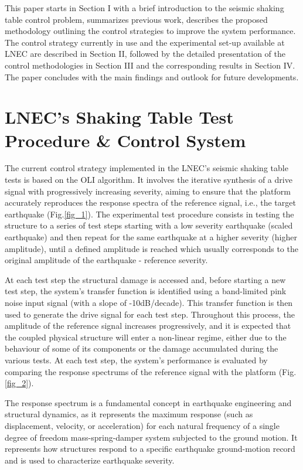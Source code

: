\documentclass[ 10pt, twocolumn]{article} %
\begin{document}
This paper starts in Section I with a brief introduction to the seismic shaking table control problem, summarizes previous work, describes the proposed methodology outlining the control strategies to improve the system performance. The control strategy currently in use and the experimental set-up available at LNEC are described in Section II, followed by the detailed presentation of the control methodologies in Section III and the corresponding results in Section IV. The paper concludes with the main findings and outlook for future developments.

\section{LNEC's Shaking Table Test Procedure \& Control System} %

The current control strategy implemented in the LNEC's seismic shaking table tests is based on the OLI algorithm. It involves the iterative synthesis of a drive signal with progressively increasing severity, aiming to ensure that the platform accurately reproduces the response spectra of the reference signal, i.e., the target earthquake (Fig.\ref{fig_1}). The experimental test procedure consists in testing the structure to a series of test steps starting with a low severity earthquake (scaled earthquake) and then repeat for the same earthquake at a higher severity (higher amplitude), until a defined amplitude is reached which usually corresponds to the original amplitude of the earthquake - reference severity.

At each test step the structural damage is accessed and, before starting a new test step, the system's transfer function is identified using a band-limited pink noise input signal (with a slope of -10dB/decade). This transfer function is then used to generate the drive signal for each test step. Throughout this process, the amplitude of the reference signal increases progressively, and it is expected that the coupled physical structure will enter a non-linear regime, either due to the behaviour of some of its components or the damage accumulated during the various tests. At each test step, the system's performance is evaluated by comparing the response spectrums of the reference signal with the platform (Fig.\ref{fig_2}).

The response spectrum is a fundamental concept in earthquake engineering and structural dynamics, as it represents the maximum response (such as displacement, velocity, or acceleration) for each natural frequency of a single degree of freedom mass-spring-damper system subjected to the ground motion. It represents how structures respond to a specific earthquake ground-motion record and is used to characterize earthquake severity.
\end{document}
